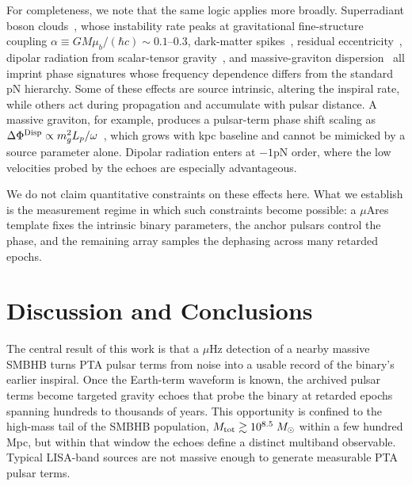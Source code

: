 \documentclass[aps,prx,twocolumn,superscriptaddress,nofootinbib,longbibliography]{revtex4-2}
\newcommand{\Msun}{M_\odot}
\begin{document}
For completeness, we note that the same logic applies more broadly. Superradiant boson clouds~\cite{Arvanitaki2010,Brito2015,Baumann2019}, whose instability rate peaks at gravitational fine-structure coupling $\alpha \equiv GM\mu_b/(\hbar c)\sim0.1$--$0.3$, dark-matter spikes~\cite{Gondolo1999,AlonsoAlvarez2024}, residual eccentricity~\cite{Peters1964,DOrazio2021,Taylor2016}, dipolar radiation from scalar-tensor gravity~\cite{Yunes2009,Barausse2016}, and massive-graviton dispersion~\cite{Will1998,ZhengLarsenEisenbergMingarelli2026} all imprint phase signatures whose frequency dependence differs from the standard pN hierarchy. Some of these effects are source intrinsic, altering the inspiral rate, while others act during propagation and accumulate with pulsar distance. A massive graviton, for example, produces a pulsar-term phase shift scaling as $\Delta\Phi^{\rm Disp}\propto m_g^2 L_p/\omega$~\cite{ZhengLarsenEisenbergMingarelli2026}, which grows with kpc baseline and cannot be mimicked by a source parameter alone. Dipolar radiation enters at $-1$pN order, where the low velocities probed by the echoes are especially advantageous.

We do not claim quantitative constraints on these effects here. What we establish is the measurement regime in which such constraints become possible: a $\mu$Ares template fixes the intrinsic binary parameters, the anchor pulsars control the phase, and the remaining array samples the dephasing across many retarded epochs.

\section{Discussion and Conclusions}\label{sec:discussion}

The central result of this work is that a $\mu$Hz detection of a nearby massive SMBHB turns PTA pulsar terms from noise into a usable record of the binary's earlier inspiral. Once the Earth-term waveform is known, the archived pulsar terms become targeted gravity echoes that probe the binary at retarded epochs spanning hundreds to thousands of years. This opportunity is confined to the high-mass tail of the SMBHB population, $M_{\rm tot} \gtrsim 10^{8.5}\;\Msun$ within a few hundred Mpc, but within that window the echoes define a distinct multiband observable. Typical LISA-band sources are not massive enough to generate measurable PTA pulsar terms.

\end{document}
